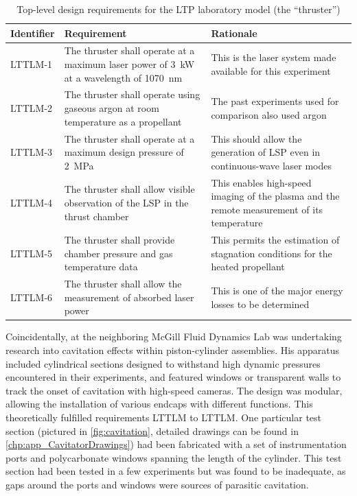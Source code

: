             \begin{table}[h]
                \renewcommand{\arraystretch}{1.3}
                \centering
                \caption[Top-level design requirements for the LTP laboratory model]{Top-level design requirements for the LTP laboratory model (the ``thruster'')}
                \label{tab:lttmReq}
                \begin{tabular}{l>{\raggedright}p{}p{}<{\raggedright}}
                    \toprule
                    \textbf{Identifier}  & \textbf{Requirement}   & \textbf{Rationale} \\
                    \midrule
                    LTTLM-1     & The thruster shall operate at a maximum laser power of \qty{3}{kW} at a wavelength of \qty{1070}{nm}    & This is the laser system made available for this experiment \\
                    LTTLM-2     & The thruster shall operate using gaseous argon at room temperature as a propellant & The past experiments used for comparison also used argon \\
                    LTTLM-3     & The thruster shall operate at a maximum design pressure of 2~\unit{MPa} & This should allow the generation of LSP even in continuous-wave laser modes \\
                    LTTLM-4     & The thruster shall allow visible observation of the LSP in the thrust chamber & This enables high-speed imaging of the plasma and the remote measurement of its temperature \\
                    LTTLM-5     & The thruster shall provide chamber pressure and gas temperature data   & This permits the estimation of stagnation conditions for the heated propellant \\
                    LTTLM-6     & The thruster shall allow the measurement of absorbed laser power   & This is one of the major energy losses to be determined \\
                    \bottomrule
                \end{tabular}
            \end{table}

            Coincidentally, \textcite{kokkalisOnsetCavitationDynamically2023} at the neighboring McGill Fluid Dynamics Lab was undertaking research into cavitation effects within piston-cylinder assemblies. His apparatus included cylindrical sections designed to withstand high dynamic pressures encountered in their experiments, and featured windows or transparent walls to track the onset of cavitation with high-speed cameras. The design was modular, allowing the installation of various endcaps with different functions. This theoretically fulfilled requirements LTTLM to LTTLM. One particular test section (pictured in \autoref{fig:cavitation}, detailed drawings can be found in \autoref{chp:app_CavitatorDrawings}) had been fabricated with a set of instrumentation ports and polycarbonate windows spanning the length of the cylinder. This test section had been tested in a few experiments but was found to be inadequate, as gaps around the ports and windows were sources of parasitic cavitation.

